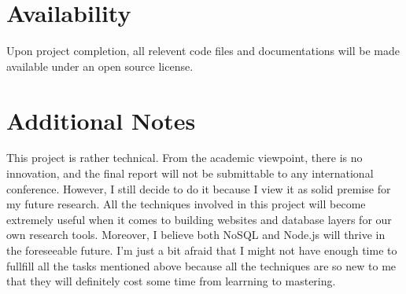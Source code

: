 \documentclass[10pt, conference, compsocconf]{../IEEEtran}
\begin{document}
\section{Availability}

Upon project completion, all relevent code files and documentations will be made available under an open source license.

\section{Additional Notes}

This project is rather technical. From the academic viewpoint, there is no innovation, and the final report will not be submittable to any international conference. However, I still decide to do it because I view it as solid premise for my future research. All the techniques involved in this project will become extremely useful when it comes to building websites and database layers for our own research tools. Moreover, I believe both NoSQL and Node.js will thrive in the foreseeable future. I'm just a bit afraid that I might not have enough time to fullfill all the tasks mentioned above because all the techniques are so new to me that they will definitely cost some time from learrning to mastering.






\end{document}
